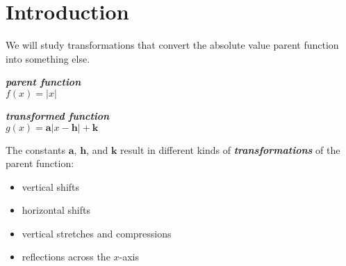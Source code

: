 \section{Introduction}

We will study transformations that convert the absolute value parent function into something else.

\begin{tcbraster}[
    raster equal height,
    raster left skip = 1in, raster right skip = 1in, 
    raster column skip = 0.5in,
    ]
    \begin{tcolorbox}[]
        \centering
        {\bfseries\itshape parent function}\\[0.5\baselineskip]
        \large
        $f(x) = |x|$
    \end{tcolorbox}
    \begin{tcolorbox}[]
        \centering
        {\bfseries\itshape transformed function}\\[0.5\baselineskip]
        \large
        $g(x) = \bm{a} | x-\bm{h} | + \bm{k}$
    \end{tcolorbox}
\end{tcbraster}

\begin{tcbraster}[]
\end{tcbraster}


The constants {$\bm{a}$}, {$\bm{h}$}, and {$\bm{k}$} result in 
different kinds of {\bfseries\itshape transformations} 
of the parent function:
\begin{itemize}[nosep]
    \item vertical shifts
    \item horizontal shifts
    \item vertical stretches and compressions
    \item reflections across the $x$-axis
\end{itemize}